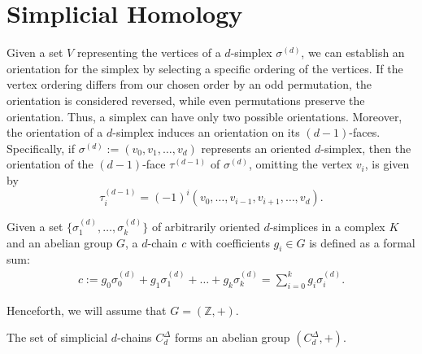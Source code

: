 \section{Simplicial Homology}
\label{Simplicial Homology}
Given a set \( V \) representing the vertices of a \( d \)-simplex
\( \sigma^{(d)} \), we can establish an orientation for the simplex by selecting a
specific ordering of the vertices. If the vertex ordering differs from our chosen
order by an odd permutation, the orientation is considered reversed, while even permutations
preserve the orientation. Thus, a simplex can have only two possible orientations.
Moreover, the orientation of a \( d \)-simplex induces an orientation on its \( (d-1) \)-faces.
Specifically, if \( \sigma^{(d)} := (v_{0}, v_{1}, \ldots, v_{d}) \) represents an oriented
\( d \)-simplex, then the orientation of the \( (d-1) \)-face \( \tau^{(d-1)} \) of
\( \sigma^{(d)} \), omitting the vertex \( v_{i} \), is given by
\begin{equation}
\tau_{i}^{(d-1)} = (-1)^{i} (v_{0}, \ldots, v_{i-1}, v_{i+1}, \ldots, v_{d}).
\end{equation}

\begin{definition}[$d$-Chain]{\cite[\S 2.3]{zomorodian2004computing}}
\label{d-Chain}
Given a set \(\{\sigma_{1}^{(d)}, \ldots, \sigma_{k}^{(d)}\}\) of arbitrarily oriented \(d\)-simplices in a complex \(K\) and an abelian group \(G\), a \(d\)-chain \(c\) with coefficients \(g_{i} \in G\) is defined as a formal sum:
\begin{align}
c := g_{0}\sigma^{(d)}_{0} + g_{1}\sigma^{(d)}_{1} + \ldots + g_{k}\sigma^{(d)}_{k} = \sum_{i=0}^{k} g_{i}\sigma^{(d)}_{i}.
\end{align}
\end{definition}

Henceforth, we will assume that \( G = (\mathbb{Z}, +) \).

\begin{lemma}
The set of simplicial \( d \)-chains \( C^{\Delta}_{d} \) forms an abelian group \( (C^{\Delta}_{d}, +) \).
\end{lemma}


